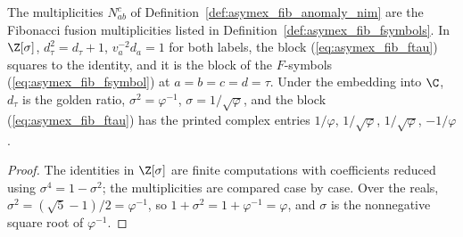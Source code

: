 \begin{lemma}
    \label{thm:asymex_fib_fsymbol_values}
    \leanok
    The multiplicities $N_{ab}^c$ of
    Definition~\ref{def:asymex_fib_anomaly_nim} are the Fibonacci
    fusion multiplicities listed in
    Definition~\ref{def:asymex_fib_fsymbols}. In $\Z[\sigma]$,
    $d_\tau^2=d_\tau+1$, $v_a^{-2}d_a=1$ for both labels, the block
    (\ref{eq:asymex_fib_ftau}) squares to the identity, and it is the
    block of the $F$-symbols (\ref{eq:asymex_fib_fsymbol}) at
    $a=b=c=d=\tau$. Under the embedding into $\C$, $d_\tau$ is the
    golden ratio, $\sigma^2=\varphi^{-1}$, $\sigma=1/\sqrt\varphi$, and
    the block (\ref{eq:asymex_fib_ftau}) has the printed complex entries
    $1/\varphi$, $1/\sqrt\varphi$, $1/\sqrt\varphi$, $-1/\varphi$.
\end{lemma}

\begin{proof}
    \leanok
    The identities in $\Z[\sigma]$ are finite computations with
    coefficients reduced using $\sigma^4=1-\sigma^2$; the
    multiplicities are compared case by case. Over the reals,
    $\sigma^2=(\sqrt5-1)/2=\varphi^{-1}$, so
    $1+\sigma^2=1+\varphi^{-1}=\varphi$, and $\sigma$ is the
    nonnegative square root of $\varphi^{-1}$.
\end{proof}

